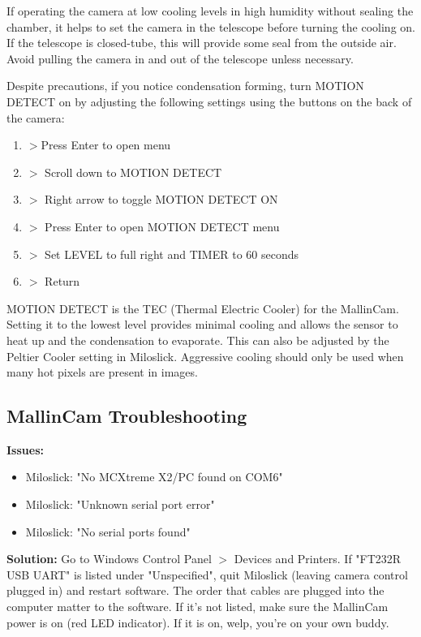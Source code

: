 \documentclass[12pt,titlepage]{article}
\begin{document}
If operating the camera at low cooling levels in high humidity without sealing the chamber, it helps to set the camera in the telescope before turning the cooling on.
If the telescope is closed-tube, this will provide some seal from the outside air.
Avoid pulling the camera in and out of the telescope unless necessary. 

Despite precautions, if you notice condensation forming, turn MOTION DETECT on by adjusting the following settings using the buttons on the back of the camera:
\begin{enumerate}
	\item[] \quad $>$Press Enter to open menu
	\item[] \quad\quad $>$ Scroll down to MOTION DETECT
	\item[] \quad\quad\quad $>$ Right arrow to toggle MOTION DETECT ON
	\item[] \quad\quad\quad\quad $>$ Press Enter to open MOTION DETECT menu
	\item[] \quad\quad\quad\quad\quad $>$ Set LEVEL to full right and TIMER to 60 seconds
	\item[] \quad\quad\quad\quad\quad\quad $>$ Return
\end{enumerate}
MOTION DETECT is the TEC (Thermal Electric Cooler) for the MallinCam. Setting it to the lowest level provides minimal cooling and allows the sensor to heat up and the condensation to evaporate. This can also be adjusted by the Peltier Cooler setting in Miloslick. Aggressive cooling should only be used when many hot pixels are present in images.


\subsection{MallinCam Troubleshooting}\label{ssec:x2troubleshoot}

\textbf{\flushleft Issues:}
\begin{itemize}
	\item Miloslick: "No MCXtreme X2/PC found on COM6"
	\item Miloslick: "Unknown serial port error"
	\item Miloslick: "No serial ports found"
\end{itemize}
\textbf{Solution:} Go to Windows Control Panel $>$ Devices and Printers. 
If "FT232R USB UART" is listed under "Unspecified", quit Miloslick (leaving camera control plugged in) and restart software.
The order that cables are plugged into the computer matter to the software.
If it's not listed, make sure the MallinCam power is on (red LED indicator).
If it is on, welp, you're on your own buddy.
\end{document}
